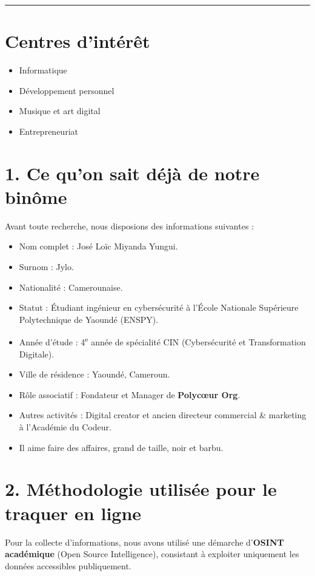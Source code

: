 \documentclass[12pt]{article}
\begin{document}
\vspace{0.5cm}
\hrule
\vspace{0.5cm}

\section*{Centres d’intérêt}
\begin{itemize}
\item Informatique
\item Développement personnel
\item Musique et art digital
\item Entrepreneuriat
\end{itemize}

\section*{1. Ce qu’on sait déjà de notre binôme}
Avant toute recherche, nous disposions des informations suivantes :
\begin{itemize}
    \item Nom complet : José Loïc Miyanda Yungui.
    \item Surnom : Jylo.
    \item Nationalité : Camerounaise.
    \item Statut : Étudiant ingénieur en cybersécurité à l’École Nationale Supérieure Polytechnique de Yaoundé (ENSPY).
    \item Année d’étude : 4\textsuperscript{e} année de spécialité CIN (Cybersécurité et Transformation Digitale).
    \item Ville de résidence : Yaoundé, Cameroun.
    \item Rôle associatif : Fondateur et Manager de \textbf{Polycœur Org}.
    \item Autres activités : Digital creator et ancien directeur commercial \& marketing à l’Académie du Codeur.
    \item Il aime faire des affaires, grand de taille, noir et barbu.
\end{itemize}

\section*{2. Méthodologie utilisée pour le traquer en ligne}
Pour la collecte d’informations, nous avons utilisé une démarche d’\textbf{OSINT académique} (Open Source Intelligence), consistant à exploiter uniquement les données accessibles publiquement.
\end{document}
